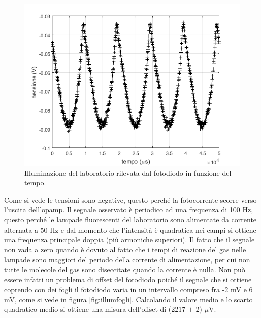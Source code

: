 \documentclass[journal, a4paper]{IEEEtran}
\begin{document}
\begin{figure}[htp]
\centering
\includegraphics[scale=.5]{es4_noncoperto}
\caption{Illuminazione del laboratorio rilevata dal fotodiodo in funzione del tempo.}
\label{fig:illnoncop}
\end{figure}

Come si vede le tensioni sono negative, questo perché la fotocorrente scorre verso l'uscita dell'opamp. Il segnale osservato è periodico ad una frequenza di 100 Hz, questo perché le lampade fluorescenti del laboratorio sono alimentate da corrente alternata a 50 Hz e dal momento che l'intensità è quadratica nei campi si ottiene una frequenza principale doppia (più armoniche superiori). Il fatto che il segnale non vada a zero quando è dovuto al fatto che i tempi di reazione del gas nelle lampade sono maggiori del periodo della corrente di alimentazione, per cui non tutte le molecole del gas sono diseccitate quando la corrente è nulla. Non può essere infatti un problema di offset del fotodiodo poiché il segnale che si ottiene coprendo con dei fogli il fotodiodo varia in un intervallo compreso fra -2 mV e 6 mV, come si vede in figura \ref{fig:illumfogli}. Calcolando il valore medio e lo scarto quadratico medio si ottiene una misura dell'offset di (2217 $\pm$ 2) $\mu$V.
\end{document}

